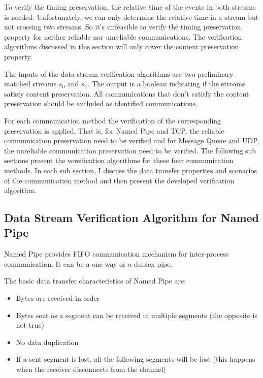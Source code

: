 To verify the timing preservation, the relative time of the events in both streams is needed. Unfortunately, we can only determine the relative time in a stream but not crossing two streams. So it's unfeasible to verify the timing preservation property for neither reliable nor unreliable communications. The verification algorithms discussed in this section will only cover the content preservation property.  

The inputs of the data stream verification algorithms are two preliminary matched streams $s_0$ and $s_1$. The output is a boolean indicating if the streams satisfy content preservation. All communications that don't satisfy the content preservation should be excluded as identified communications.

For each communication method the verification of the corresponding preservation is applied, That is, for Named Pipe and TCP, the reliable communication preservation need to be verified and for Message Queue and UDP, the unreliable communication preservation need to be verified. The following sub sections present the versification  algorithms for these four communication methods. In each sub section, I discuss the data transfer properties and scenarios of the communication method and then present the developed verification algorithm.

\subsection{Data Stream Verification Algorithm for Named Pipe}
Named Pipe provides FIFO communication mechanism for inter-process communication. It can be a one-way or a duplex pipe. \cite{khambattinamed}

The basic data transfer characteristics of Named Pipe are:
\begin{itemize}
  \item Bytes are received in order
  \item Bytes sent as a segment can be received in multiple segments (the opposite is not true)
  \item No data duplication
  \item If a sent segment is lost, all the following segments will be lost (this happens when the receiver disconnects from the channel) 
  
\end{itemize}

